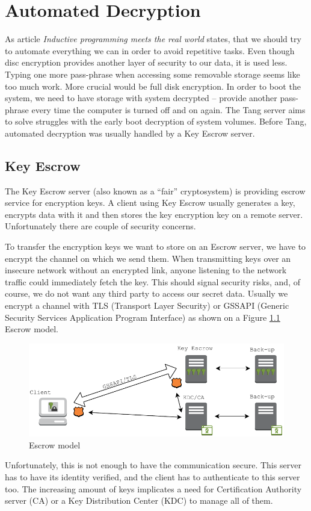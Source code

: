\chapter{Automated Decryption}

As article {\it Inductive programming meets the real world} \cite{Gulwani2015} states, that we should try to automate everything we can in order to avoid repetitive tasks.
Even though disc encryption provides another layer of security to our data, it is used less.
Typing one more pass-phrase when accessing some removable storage seems like too much work.
More crucial would be full disk encryption.
In order to boot the system, we need to have storage with system decrypted -- provide another pass-phrase every time the computer is turned off and on again.
The Tang server aims to solve struggles with the early boot decryption of system volumes.
Before Tang, automated decryption was usually handled by a Key Escrow server.

\section{Key Escrow}\label{escrow}

The Key Escrow server (also known as a “fair” cryptosystem) is providing escrow service for encryption keys.
A client using Key Escrow usually generates a key, encrypts data with it and then stores the key encryption key on a remote server.
Unfortunately there are couple of security concerns.

To transfer the encryption keys we want to store on an Escrow server, we have to encrypt the channel on which we send them.
When transmitting keys over an insecure network without an encrypted link, anyone listening to the network traffic could immediately fetch the key.
This should signal security risks, and, of course, we do not want any third party to access our secret data.
Usually we encrypt a channel with TLS (Transport Layer Security) or GSSAPI (Generic Security Services Application Program Interface) as shown on a Figure \ref{fig_escrowmodel} Escrow model.
\begin{figure}[h]
    \centering
    \includegraphics[scale=0.7]{figures/EscrowModel.pdf}
    \caption{Escrow model}
    \label{fig_escrowmodel}
\end{figure}
Unfortunately, this is not enough to have the communication secure.
This server has to have its identity verified, and the client has to authenticate to this server too.
The increasing amount of keys implicates a need for Certification Authority server (CA) or a Key Distribution Center (KDC) to manage all of them.

